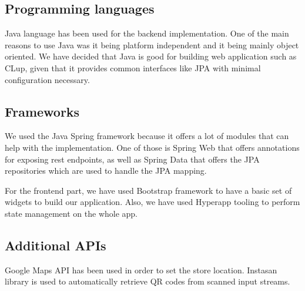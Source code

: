 \subsection{Programming languages}

Java language has been used for the backend implementation.
One of the main reasons to use Java was it being platform independent and it being mainly object oriented.
We have decided that Java is good for building web application such as CLup, given that it provides common interfaces like JPA with minimal configuration necessary.

\subsection{Frameworks}

We used the Java Spring framework because it offers a lot of modules that can help with the implementation.
One of those is Spring Web that offers annotations for exposing rest endpoints, as well as Spring Data
that offers the JPA repositories which are used to handle the JPA mapping.

For the frontend part, we have used Bootstrap framework to have a basic set of widgets to build our application.
Also, we have used Hyperapp tooling to perform state management on the whole app.
\subsection{Additional APIs}

Google Maps API has been used in order to set the store location.
Instasan library is used to automatically retrieve QR codes from scanned input streams.
